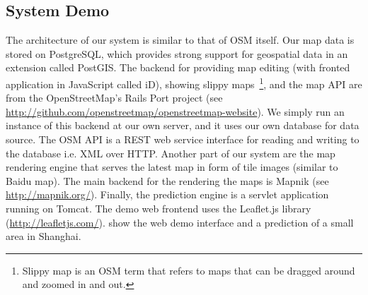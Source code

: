 \subsection{System Demo}
The architecture of our system is similar to that of OSM itself. 
Our map data is stored on PostgreSQL, which provides strong support for
geospatial data in an extension called PostGIS. 
The backend for providing map editing (with fronted application in JavaScript 
called iD), showing slippy maps~\footnote{Slippy map is an OSM term that refers
to maps that can be dragged around and zoomed in and out.}, 
and the map API are from the OpenStreetMap's 
Rails Port project (see \url{http://github.com/openstreetmap/openstreetmap-website}). 
We simply run an instance of this backend at our own server, 
and it uses our own database for data source. The OSM API is a REST web service 
interface for reading and writing to the database i.e. XML over HTTP.
Another part of our system are the map rendering engine that serves 
the latest map in form of tile images (similar to Baidu map). 
The main backend for the rendering the maps is Mapnik 
(see \url{http://mapnik.org/}).
Finally, the prediction engine is a servlet application running on
Tomcat. The demo web frontend uses the Leaflet.js library 
(\url{http://leafletjs.com/}). 
show the web demo interface and a prediction of a small area in Shanghai.

